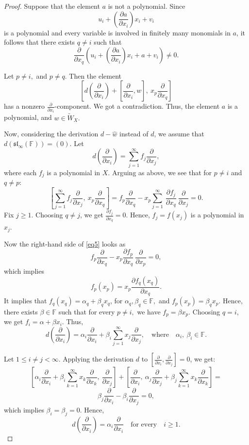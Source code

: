 \documentclass[12pt,a4paper]{amsart}
\theoremstyle{plain}
\begin{document}
\begin{proof}
		
		Suppose that the element $a$ is not a polynomial. Since \[  u_i + \left(\frac{\partial a}{\partial x_i} \right)x_i + v_i \] is a polynomial and every variable is involved in finitely many monomials in \( a \), it follows that there exists \( q \neq i \) such that
		\[
		\frac{\partial}{\partial x_q}\left(u_i + \left(\frac{\partial a}{\partial x_i}\right) x_i + a + v_i\right) \neq 0.
		\]
		
		Let $p \neq i,$ and $ p \neq q.$  Then the element
		\[
		\left[  d\left( \frac{\partial}{\partial x_i} \right) + \left[ \frac{\partial}{\partial x_i}, w \right] , \ x_p \frac{\partial}{\partial x_q}\right]
		\]
		has a nonzero \( \frac{\partial}{\partial x_i} \)-component. We got a contradiction. Thus, the element $a$ is a polynomial, and $w\in \widetilde{W}_X.$  
		
		
		Now, considering the derivation $d - \hat{w}$ instead of $d$, we assume that $d(\mathfrak{sl}_\infty(\mathbb{F})) = (0).$ Let
		\[
		d\left(\frac{\partial}{\partial x_i}\right) = \sum_{j=1}^{\infty} f_j \frac{\partial}{\partial x_j}, \] where each $ f_j $ is a polynomial in $X.$ Arguing as above, we see that for $p \neq i$ and $q \neq p$:
		\begin{equation}\label{eq5}
			\left[ \sum_{j=1}^{\infty} f_j  \frac{\partial}{\partial x_j}, \ x_p \frac{\partial}{\partial x_q} \right] = 
			f_p \frac{\partial}{\partial x_q} - x_p  \sum_{j=1}^{\infty} \ \frac{\partial f_j}{\partial x_q} \ \frac{\partial}{\partial x_j} = 0 .
		\end{equation}
		Fix $j \geq 1$. Choosing $q \neq j$, we get $\frac{\partial f_j}{\partial x_q} = 0.$  Hence,
		$f_j = f(x_j)$ is a polynomial in $x_j.$
		
		Now the right-hand side of \eqref{eq5} looks as
		\[
		f_p  \frac{\partial}{\partial x_q} - x_p  \frac{\partial f_p}{\partial x_q}\  \frac{\partial}{\partial x_p} = 0,
		\]
		which implies
		\[
		f_p(x_p) = x_p  \frac{\partial f_q(x_q)}{\partial x_q}.
		\] It implies that $f_q(x_q) = \alpha_q + \beta_q x_q$, for $\alpha_q, \beta_q \in \mathbb{F},$ and $f_p(x_p) =  \beta_q x_p.$  Hence, there exists $\beta \in \mathbb{F}$ such that for every $p\not= i, $  we have 
		$f_p = \beta x_p.$ Choosing $q = i$, we get $f_i = \alpha + \beta x_i$. Thus,
		\[
		d\left( \frac{\partial}{\partial x_i} \right) = \alpha_i  \frac{\partial}{\partial x_i} + \beta_i  \sum_{j=1}^{\infty} x_j  \frac{\partial}{\partial x_j}, \quad \text{where} \quad \alpha_i, \ \beta_i \in \mathbb{F}.
		\]
		
		Let $1 \leq i \neq j < \infty$. Applying the derivation $d$ to $[\frac{\partial}{\partial x_i}, \frac{\partial}{\partial x_j}] = 0$, we get:
		\[
		\left[ \alpha_i   \frac{\partial}{\partial x_i} + \beta_i  \sum_{k=1}^{\infty}  x_k  \frac{\partial}{\partial x_k}, \ \frac{\partial}{\partial x_j} \right] + \left[ \frac{\partial}{\partial x_i}, \ \alpha_j  \frac{\partial}{\partial x_j} + \beta_j  \sum_{k=1}^{\infty}  x_k  \frac{\partial}{\partial x_k} \right] = 
		\]
		\[ \beta_j  \frac{\partial}{\partial x_i} -\beta_i \frac{\partial}{\partial x_j} = 0,
		\]
		which implies $\beta_i = \beta_j = 0$.
		Hence, $$d\left(\frac{\partial}{\partial x_i}\right) = \alpha_i   \frac{\partial}{\partial x_i} \quad \text{for every} \quad  i \geq 1.$$
		

\end{proof}
\end{document}
